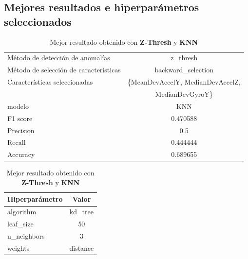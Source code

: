 \begin{appendices}
	\section*{Mejores resultados e hiperparámetros seleccionados}
		\begin{table}[htb]
			\centering
			\caption{Mejor resultado obtenido con \textbf{Z-Thresh} y \textbf{KNN}}
			\label{table:17}
			\begin{tabular}{lc}
				\toprule
					  Método de detección de anomalías &                                         z\_thresh \\
				Método de selección de características &                               backward\_selection \\
						 Características seleccionadas & \{MeanDevAccelY, MedianDevAccelZ,    \\
						 							   &									MedianDevGyroY\} \\
												modelo &                                              KNN \\
											  F1 score &                                         0.470588 \\
											 Precision &                                              0.5 \\
												Recall &                                         0.444444 \\
											  Accuracy &                                         0.689655 \\
				\bottomrule
			\end{tabular}
			\newline
			\newline

			\begin{tabular}{lc}
				\toprule
				Hiperparámetro &    Valor \\
				\midrule
					 algorithm &  kd\_tree \\
					 leaf\_size &       50 \\
				   n\_neighbors &        3 \\
					   weights & distance \\
				\bottomrule
			\end{tabular}
			
			
		\end{table}


\end{appendices}
